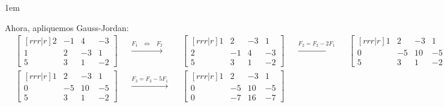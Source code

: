 \documentclass[12pt, fleqn]{report}                             %
\newenvironment{SmallIndentation}[1][0.75em]                    %
        {\begin{adjustwidth}{#1}{}\begin{footnotesize}}             %
        {\end{footnotesize}\end{adjustwidth}}                       %
\DeclareMathOperator \Space     {\quad}                         %
\DeclareMathOperator \MiniSpace {\;}                            %
\theoremstyle{break}                                            %
\newcommand \lEqual  {\MiniSpace \Leftrightarrow \MiniSpace}    %
\newcommand \lLongTo {\longrightarrow}                          %
\begin{document}
\begin{SmallIndentation}[1em]
                    Ahora, apliquemos Gauss-Jordan:
                    \begin{align*}
                        &
                        \begin{bmatrix}[r r r | r]
                            2 & -1 &  4 & -3       \\
                            1 &  2 & -3 &  1       \\
                            5 &  3 &  1 & -2  
                        \end{bmatrix}
                        &&
                        \overset{F_1 \lEqual F_2}{\lLongTo}
                        &&
                        \begin{bmatrix}[r r r | r]
                            1 &  2 & -3 &  1       \\
                            2 & -1 &  4 & -3       \\
                            5 &  3 &  1 & -2  
                        \end{bmatrix}
                        &&
                        \overset{F_2 = F_2 -2F_1}{\lLongTo}
                        &&
                        \begin{bmatrix}[r r r | r]
                            1 &  2 & -3 &  1       \\
                            0 & -5 & 10 & -5       \\
                            5 &  3 &  1 & -2  
                        \end{bmatrix}
                        \\
                        &
                        \begin{bmatrix}[r r r | r]
                            1 &  2 & -3 &  1       \\
                            0 & -5 & 10 & -5       \\
                            5 &  3 &  1 & -2  
                        \end{bmatrix}
                        &&
                        \overset{F_3 = F_3 -5F_1}{\lLongTo}
                        &&
                        \begin{bmatrix}[r r r | r]
                            1 &  2 & -3  &  1       \\
                            0 & -5 & 10  & -5       \\
                            0 & -7 & 16  & -7  
                        \end{bmatrix}

\end{align*}
\end{SmallIndentation}
\end{document}
